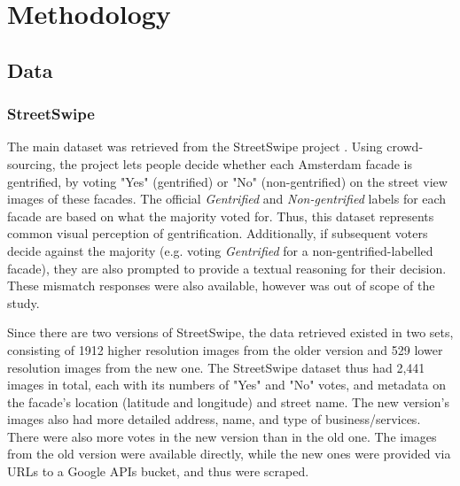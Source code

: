 \section{Methodology}
\label{sec:methodology}

\subsection{Data}
\subsubsection{StreetSwipe}
The main dataset was retrieved from the StreetSwipe project \cite{streetswipe}. Using crowd-sourcing, the project lets people decide whether each Amsterdam facade is gentrified, by voting "Yes" (gentrified) or "No" (non-gentrified) on the street view images of these facades. The official \textit{Gentrified} and \textit{Non-gentrified} labels for each facade are based on what the majority voted for. Thus, this dataset represents common visual perception of gentrification. Additionally, if subsequent voters decide against the majority (e.g. voting \textit{Gentrified} for a non-gentrified-labelled facade), they are also prompted to provide a textual reasoning for their decision. These mismatch responses were also available, however was out of scope of the study. 

Since there are two versions of StreetSwipe, the data retrieved existed in two sets, consisting of 1912 higher resolution images from the older version and 529 lower resolution images from the new one. The StreetSwipe dataset thus had 2,441 images in total, each with its numbers of "Yes" and "No" votes, and metadata on the facade's location (latitude and longitude) and street name. The new version's images also had more detailed address, name, and type of business/services. There were also more votes in the new version than in the old one. The images from the old version were available directly, while the new ones were provided via URLs to a Google APIs bucket, and thus were scraped.

